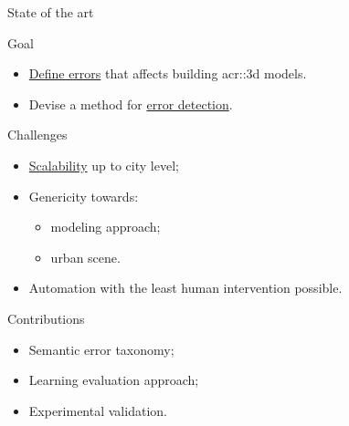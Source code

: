 \documentclass[10pt]{beamer}
\begin{document}
            \begin{frame}{State of the art}
                \centering
                
            \end{frame}

            \begin{frame}{Goal}
                \begin{itemize}[label=\(\blacktriangleright\), font=\color{IGNGreen}]
                    \item<1-> \underline{Define errors} that affects building \gls{acr::3d} models.
                    \item<2-> Devise a method for \underline{error detection}.
                \end{itemize}
            \end{frame}

            \begin{frame}{Challenges}
                \begin{itemize}[label=\(\blacktriangleright\), font=\color{IGNGreen}]
                    \item<1-> \underline{Scalability} up to city level;
                    \item<2-> Genericity towards:
                        \begin{itemize}
                            \item<3-> modeling approach;
                            \item<4-> urban scene.
                        \end{itemize}
                    \item<5-> Automation with the least human intervention possible.
                \end{itemize}
            \end{frame}

            \begin{frame}{Contributions}
                \begin{itemize}[label=\(\blacktriangleright\), font=\color{IGNGreen}, itemsep=2em]
                    \item<1-> Semantic error taxonomy;
                    \item<2-> Learning evaluation approach;
                    \item<3-> Experimental validation.
                \end{itemize}
            \end{frame}
\end{document}
